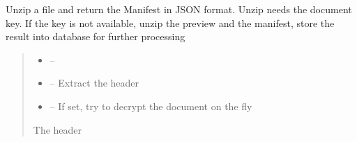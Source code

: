 \documentclass[letterpaper,10pt,english]{sphinxmanual}
\begin{document}
\begin{savenotes}
\begin{fulllineitems}
\begin{savenotes}
\begin{fulllineitems}
\begin{quote}
\begin{description}
\sphinxAtStartPar


\end{description}\end{quote}

\end{fulllineitems}\end{savenotes}


\begin{savenotes}\begin{fulllineitems}
\label{\detokenize{eezz:eezz.document.TDocuments.unzip}}
\pysigstartsignatures
{}
\pysigstopsignatures
\sphinxAtStartPar
Unzip a file and return the Manifest in JSON format. Unzip needs the document key. If the key is not
available, unzip the preview and the manifest, store the result into database for further processing
\begin{quote}\begin{description}
\begin{itemize}
\item {} 
\sphinxAtStartPar
{} – 

\item {} 
\sphinxAtStartPar
{} – Extract the header

\item {} 
\sphinxAtStartPar
{} – If set, try to decrypt the document on the fly

\end{itemize}

\sphinxAtStartPar
The header

\end{description}\end{quote}

\end{fulllineitems}\end{savenotes}


\end{fulllineitems}
\end{savenotes}
\end{document}
